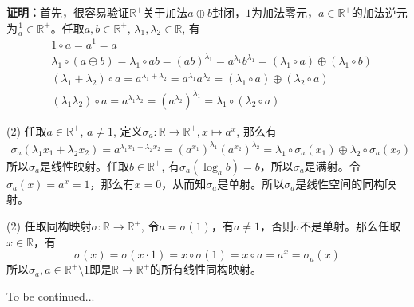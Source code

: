 {\bf 证明：}首先，很容易验证$\mathbb{R}^+$关于加法$a\oplus b$封闭，$1$为加法零元，$a\in\mathbb{R}^+$的加法逆元为$\frac{1}{a}\in\mathbb{R}^+$。任取$a,b\in\mathbb{R}^+$, $\lambda_1,\lambda_2\in\mathbb{R}$, 有
\begin{align*}
& 1\circ a = a^1 = a \\
& \lambda_1 \circ (a\oplus b) = \lambda_1 \circ ab = (ab)^{\lambda_1} = a^{\lambda_1} b^{\lambda_1} = (\lambda_1\circ a) \oplus (\lambda_1\circ b) \\
& (\lambda_1 + \lambda_2) \circ a = a^{\lambda_1 + \lambda_2} = a^{\lambda_1} a^{\lambda_2} = (\lambda_1 \circ a) \oplus (\lambda_2 \circ a) \\
& (\lambda_1\lambda_2)\circ a = a^{\lambda_1\lambda_2} = (a^{\lambda_2})^{\lambda_1} = \lambda_1 \circ (\lambda_2 \circ a)
\end{align*}

(2) 任取$a\in\mathbb{R}^{+}$, $a \neq 1$, 定义$\sigma_a: \mathbb{R} \to \mathbb{R}^{+}, x \mapsto a^x$, 那么有
\begin{align*}
\sigma_a(\lambda_1x_1 + \lambda_2x_2) = a^{\lambda_1x_1 + \lambda_2x_2} = (a^{x_1})^{\lambda_1} (a^{x_2})^{\lambda_2} = \lambda_1\circ \sigma_a(x_1) \oplus \lambda_2\circ \sigma_a(x_2)
\end{align*}
所以$\sigma_a$是线性映射。任取$b\in\mathbb{R}^{+}$, 有$\sigma_a(\log_a b) = b$，所以$\sigma_a$是满射。令$\sigma_a(x) = a^x = 1$，那么有$x = 0$，从而知$\sigma_a$是单射。所以$\sigma_a$是线性空间的同构映射。

(2) 任取同构映射$\sigma: \mathbb{R} \to \mathbb{R}^{+}$, 令$a = \sigma(1)$，有$a\neq 1$，否则$\sigma$不是单射。那么任取$x\in\mathbb{R}$，有
$$\sigma(x) = \sigma(x\cdot 1) = x \circ \sigma(1) = x \circ a = a^{x} = \sigma_a(x)$$
所以$\sigma_a, a\in\mathbb{R}^{+} \setminus {1}$即是$\mathbb{R} \to \mathbb{R}^{+}$的所有线性同构映射。

\newpageorvspace

To be continued...


